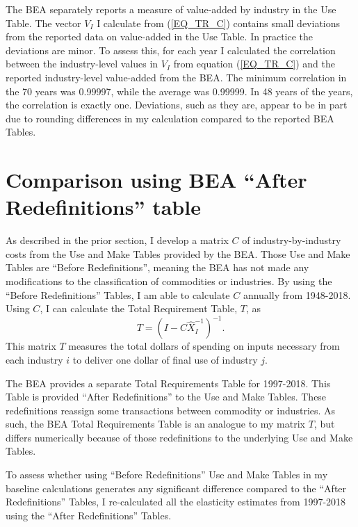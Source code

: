 \documentclass[11pt]{article}
\begin{document}
The BEA separately reports a measure of value-added by industry in the Use Table. The vector $V_I$ I calculate from (\ref{EQ_TR_C}) contains small deviations from the reported data on value-added in the Use Table. In practice the deviations are minor. To assess this, for each year I calculated the correlation between the industry-level values in $V_I$ from equation (\ref{EQ_TR_C}) and the reported industry-level value-added from the BEA. The minimum correlation in the 70 years was 0.99997, while the average was 0.99999. In 48 years of the years, the correlation is exactly one. Deviations, such as they are, appear to be in part due to rounding differences in my calculation compared to the reported BEA Tables. 

\section{Comparison using BEA ``After Redefinitions'' table}
As described in the prior section, I develop a matrix $C$ of industry-by-industry costs from the Use and Make Tables provided by the BEA. Those Use and Make Tables are ``Before Redefinitions'', meaning the BEA has not made any modifications to the classification of commodities or industries. By using the ``Before Redefinitions'' Tables, I am able to calculate $C$ annually from 1948-2018. Using $C$, I can calculate the Total Requirement Table, $T$, as
\begin{equation}
	T = \left(I - C \hat{X}_I^{-1}\right)^{-1}.
\end{equation}
This matrix $T$ measures the total dollars of spending on inputs necessary from each industry $i$ to deliver one dollar of final use of industry $j$. 

The BEA provides a separate Total Requirements Table for 1997-2018. This Table is provided ``After Redefinitions'' to the Use and Make Tables. These redefinitions reassign some transactions between commodity or industries. As such, the BEA Total Requirements Table is an analogue to my matrix $T$, but differs numerically because of those redefinitions to the underlying Use and Make Tables. 

To assess whether using ``Before Redefinitions'' Use and Make Tables in my baseline calculations generates any significant difference compared to the ``After Redefinitions'' Tables, I re-calculated all the elasticity estimates from 1997-2018 using the ``After Redefinitions'' Tables. 
\end{document}
